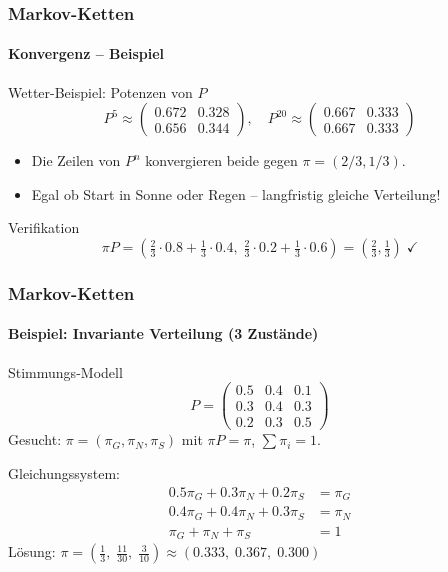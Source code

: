 \documentclass{beamer}
\begin{document}

\begin{frame}
    \frametitle{Markov-Ketten}
\framesubtitle{Konvergenz -- Beispiel}
    \begin{block}{Wetter-Beispiel: Potenzen von $P$}
\[
P^5 \approx \begin{pmatrix} 0.672 & 0.328 \\ 0.656 & 0.344 \end{pmatrix}, \quad
P^{20} \approx \begin{pmatrix} 0.667 & 0.333 \\ 0.667 & 0.333 \end{pmatrix}
\]
\end{block}
\begin{itemize}
\item Die Zeilen von $P^n$ konvergieren beide gegen $\pi = (2/3, 1/3)$.
\item Egal ob Start in Sonne oder Regen -- langfristig gleiche Verteilung!
\end{itemize}
\begin{block}{Verifikation}
\[
\pi P = \left(\tfrac{2}{3} \cdot 0.8 + \tfrac{1}{3} \cdot 0.4, \; \tfrac{2}{3} \cdot 0.2 + \tfrac{1}{3} \cdot 0.6\right) = \left(\tfrac{2}{3}, \tfrac{1}{3}\right) \;\checkmark
\]
\end{block}
 \end{frame}



\begin{frame}
    \frametitle{Markov-Ketten}
\framesubtitle{Beispiel: Invariante Verteilung (3 Zustände)}
    \begin{block}{Stimmungs-Modell}
\[
P = \begin{pmatrix} 0.5 & 0.4 & 0.1 \\ 0.3 & 0.4 & 0.3 \\ 0.2 & 0.3 & 0.5 \end{pmatrix}
\]
Gesucht: $\pi = (\pi_G, \pi_N, \pi_S)$ mit $\pi P = \pi$, \; $\sum \pi_i = 1$.
\end{block}
Gleichungssystem:
\begin{align*}
0.5\pi_G + 0.3\pi_N + 0.2\pi_S &= \pi_G \\
0.4\pi_G + 0.4\pi_N + 0.3\pi_S &= \pi_N \\
\pi_G + \pi_N + \pi_S &= 1
\end{align*}
Lösung: $\pi = \left(\frac{1}{3},\; \frac{11}{30},\; \frac{3}{10}\right) \approx (0.333,\; 0.367,\; 0.300)$
 \end{frame}
\end{document}
